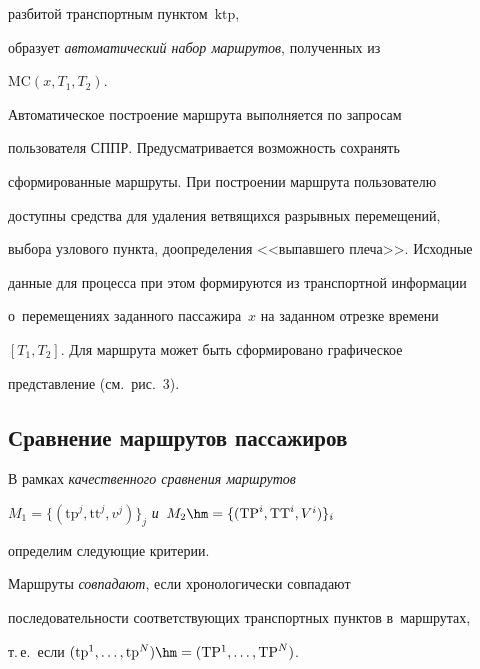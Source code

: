 \pagebreak





\noindent


 разбитой транспортным пунктом~$\mathrm{ktp}$, 


образует \textit{автоматический набор маршрутов}, полученных из  


$\mathrm{MC}(x, T_1, T_2)$.





Автоматическое построение маршрута выполняется по запросам 


пользователя СППР. Предусматривается возможность сохранять 


сформированные маршруты. При построении маршрута пользователю 


доступны средства для удаления вет\-вя\-щих\-ся разрывных перемещений, 


выбора узлового пункта, доопределения <<вы\-пав\-ше\-го плеча>>. Исходные 


данные для процесса при этом формируются из транспортной информации 


о~перемещениях заданного пассажира~$x$ на заданном отрезке времени 


$[T_1, T_2]$. Для маршрута может быть сформировано графическое 


представление (см.\ рис.~3).





\subsection{Сравнение маршрутов пассажиров} %





В рамках \textit{качественного сравнения маршрутов} 


$M_1 = \{(\mathrm{tp}^j, \mathrm{tt}^j, v^j)\}_j$ \textit{и}~$M_2 \hm= \{(\mathrm{TP}^i, \mathrm{TT}^i, V^i)\}_i$ 


определим следующие критерии.





Маршруты \textit{совпадают}, если хронологически совпадают 


последовательности со\-от\-вет\-ст\-ву\-ющих транспортных пунк\-тов в~маршрутах, 


т.\,е.\ если $(\mathrm{tp}^1, \ldots, \mathrm{tp}^N) \hm= (\mathrm{TP^1}, \ldots, \mathrm{TP}^N)$.






